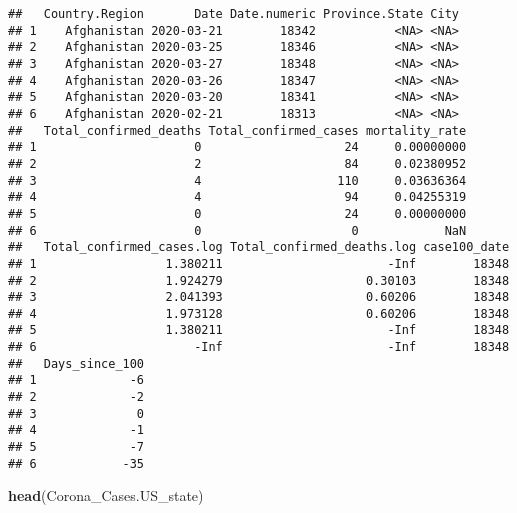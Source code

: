 \documentclass[]{article}
\newenvironment{Shaded}{\begin{snugshade}}{\end{snugshade}}
\newcommand{\KeywordTok}[1]{\textcolor[rgb]{0.13,0.29,0.53}{\textbf{{#1}}}}
\newcommand{\DataTypeTok}[1]{\textcolor[rgb]{0.13,0.29,0.53}{{#1}}}
\newcommand{\DecValTok}[1]{\textcolor[rgb]{0.00,0.00,0.81}{{#1}}}
\newcommand{\StringTok}[1]{\textcolor[rgb]{0.31,0.60,0.02}{{#1}}}
\newcommand{\CommentTok}[1]{\textcolor[rgb]{0.56,0.35,0.01}{\textit{{#1}}}}
\newcommand{\NormalTok}[1]{{#1}}
\begin{document}
\begin{Shaded}
\end{Shaded}

\begin{verbatim}
##   Country.Region       Date Date.numeric Province.State City
## 1    Afghanistan 2020-03-21        18342           <NA> <NA>
## 2    Afghanistan 2020-03-25        18346           <NA> <NA>
## 3    Afghanistan 2020-03-27        18348           <NA> <NA>
## 4    Afghanistan 2020-03-26        18347           <NA> <NA>
## 5    Afghanistan 2020-03-20        18341           <NA> <NA>
## 6    Afghanistan 2020-02-21        18313           <NA> <NA>
##   Total_confirmed_deaths Total_confirmed_cases mortality_rate
## 1                      0                    24     0.00000000
## 2                      2                    84     0.02380952
## 3                      4                   110     0.03636364
## 4                      4                    94     0.04255319
## 5                      0                    24     0.00000000
## 6                      0                     0            NaN
##   Total_confirmed_cases.log Total_confirmed_deaths.log case100_date
## 1                  1.380211                       -Inf        18348
## 2                  1.924279                    0.30103        18348
## 3                  2.041393                    0.60206        18348
## 4                  1.973128                    0.60206        18348
## 5                  1.380211                       -Inf        18348
## 6                      -Inf                       -Inf        18348
##   Days_since_100
## 1             -6
## 2             -2
## 3              0
## 4             -1
## 5             -7
## 6            -35
\end{verbatim}

\begin{Shaded}
\begin{Highlighting}[]
\KeywordTok{head}\NormalTok{(Corona_Cases.US_state)}
\end{Highlighting}
\end{Shaded}
\end{document}

